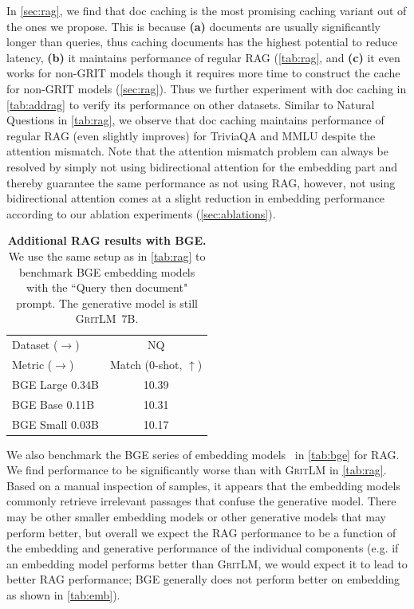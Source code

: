 \documentclass{article}
\newcommand{\model}{\textsc{GritLM}}
\newcommand{\modelbase}{\textsc{GritLM~7B}}
\begin{document}
In \autoref{sec:rag}, we find that doc caching is the most promising caching variant out of the ones we propose. This is because \textbf{(a)} documents are usually significantly longer than queries, thus caching documents has the highest potential to reduce latency, \textbf{(b)} it maintains performance of regular RAG (\autoref{tab:rag}, and \textbf{(c)} it even works for non-GRIT models though it requires more time to construct the cache for non-GRIT models (\autoref{sec:rag}). Thus we further experiment with doc caching in \autoref{tab:addrag} to verify its performance on other datasets. Similar to Natural Questions in \autoref{tab:rag}, we observe that doc caching maintains performance of regular RAG (even slightly improves) for TriviaQA and MMLU despite the attention mismatch. Note that the attention mismatch problem can always be resolved by simply not using bidirectional attention for the embedding part and thereby guarantee the same performance as not using RAG, however, not using bidirectional attention comes at a slight reduction in embedding performance according to our ablation experiments (\autoref{sec:ablations}).

\begin{table}
\centering
\caption{\textbf{Additional RAG results with BGE.} We use the same setup as in \autoref{tab:rag} to benchmark BGE embedding models with the ``Query then document" prompt. The generative model is still \modelbase{}.}
\begin{tabular}{l|c}
\toprule
Dataset ($\rightarrow$) & NQ \\
Metric ($\rightarrow$) & Match (0-shot, $\uparrow$) \\
\midrule
BGE Large 0.34B & 10.39 \\
BGE Base 0.11B & 10.31 \\
BGE Small 0.03B & 10.17 \\
\bottomrule
\end{tabular}
\label{tab:bge}
\end{table}

We also benchmark the BGE series of embedding models~\citep{xiao2023cpack} in \autoref{tab:bge} for RAG. We find performance to be significantly worse than with \model{} in \autoref{tab:rag}. Based on a manual inspection of samples, it appears that the embedding models commonly retrieve irrelevant passages that confuse the generative model. There may be other smaller embedding models or other generative models that may perform better, but overall we expect the RAG performance to be a function of the embedding and generative performance of the individual components (e.g. if an embedding model performs better than \model{}, we would expect it to lead to better RAG performance; BGE generally does not perform better on embedding as shown in \autoref{tab:emb}).
\end{document}
